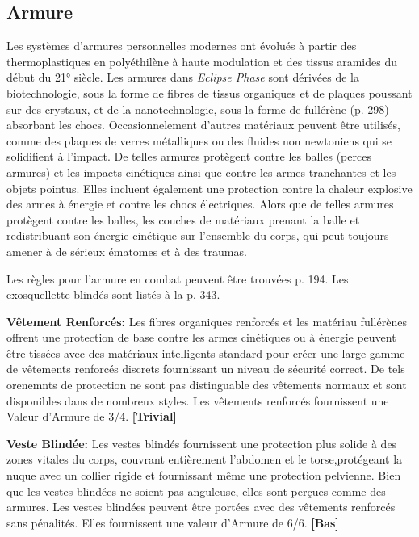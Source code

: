 \subsection{Armure} \label{sec:armor} 

Les systèmes d'armures personnelles modernes ont évolués à partir des thermoplastiques en polyéthilène à haute modulation et des tissus aramides du début du 21° siècle. Les armures dans \emph{Eclipse Phase} sont dérivées de la biotechnologie, sous la forme de fibres de tissus organiques et de plaques poussant sur des crystaux, et de la nanotechnologie, sous la forme de fullérène (p. 298) absorbant les chocs. Occasionnelement d'autres matériaux peuvent être utilisés, comme des plaques de verres métalliques ou des fluides non newtoniens qui se solidifient à l'impact. De telles armures protègent contre les balles (perces armures) et les impacts cinétiques ainsi que contre les armes tranchantes et les objets pointus. Elles incluent également une protection contre la chaleur explosive des armes à énergie et contre les chocs électriques. Alors que de telles armures protègent contre les balles, les couches de matériaux prenant la balle et redistribuant son énergie cinétique sur l'ensemble du corps, qui peut toujours amener à de sérieux ématomes et à des traumas. 

Les règles pour l'armure en combat peuvent être trouvées p. 194. Les exosquellette blindés sont listés à la p. 343. 

\textbf{Vêtement Renforcés:} Les fibres organiques renforcés et les matériau fullérènes offrent une protection de base contre les armes cinétiques ou à énergie peuvent être tissées avec des matériaux intelligents standard pour créer une large gamme de vêtements renforcés discrets fournissant un niveau de sécurité correct. De tels orenemnts de protection ne sont pas distinguable des vêtements normaux et sont disponibles dans de nombreux styles. Les vêtements renforcés fournissent une Valeur d'Armure de 3/4. \textbf{[Trivial]} 

\textbf{Veste Blindée:} Les vestes blindés fournissent une protection plus solide à des zones vitales du corps, couvrant entièrement l'abdomen et le torse,protégeant la nuque avec un collier rigide et fournissant même une protection pelvienne. Bien que les vestes blindées ne soient pas anguleuse, elles sont perçues comme des armures. Les vestes blindées peuvent être portées avec des vêtements renforcés sans pénalités. Elles fournissent une valeur d'Armure de 6/6. \textbf{[Bas]} 

